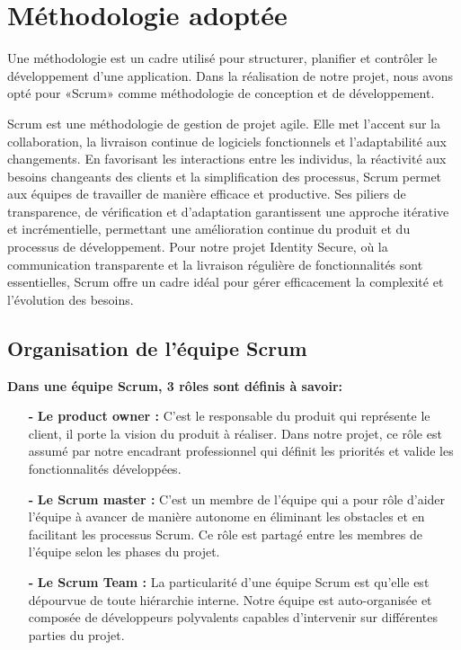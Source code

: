 \section*{Méthodologie adoptée}

Une méthodologie est un cadre utilisé pour structurer, planifier et contrôler le développement d'une application. Dans la réalisation de notre projet, nous avons opté pour «Scrum» comme méthodologie de conception et de développement.

Scrum est une méthodologie de gestion de projet agile\cite{b6}. Elle met l'accent sur la collaboration, la livraison continue de logiciels fonctionnels et l'adaptabilité aux changements. En favorisant les interactions entre les individus, la réactivité aux besoins changeants des clients et la simplification des processus, Scrum permet aux équipes de travailler de manière efficace et productive. Ses piliers de transparence, de vérification et d'adaptation garantissent une approche itérative et incrémentielle, permettant une amélioration continue du produit et du processus de développement. Pour notre projet Identity Secure, où la communication transparente et la livraison régulière de fonctionnalités sont essentielles, Scrum offre un cadre idéal pour gérer efficacement la complexité et l'évolution des besoins.
\\

\subsection{Organisation de l'équipe Scrum}

\textbf{Dans une équipe Scrum, 3 rôles sont définis à savoir: }\\

\begin{itemize}
\item[\textbf{-}] \textbf{Le product owner :} C'est le responsable du produit qui représente le client, il porte la vision du produit à réaliser. Dans notre projet, ce rôle est assumé par notre encadrant professionnel qui définit les priorités et valide les fonctionnalités développées.
\item[\textbf{-}] \textbf{Le Scrum master :} C'est un membre de l'équipe qui a pour rôle d'aider l'équipe à avancer de manière autonome en éliminant les obstacles et en facilitant les processus Scrum. Ce rôle est partagé entre les membres de l'équipe selon les phases du projet.
\item[\textbf{-}] \textbf{Le Scrum Team :} La particularité d'une équipe Scrum est qu'elle est dépourvue de toute hiérarchie interne. Notre équipe est auto-organisée et composée de développeurs polyvalents capables d'intervenir sur différentes parties du projet.
\end{itemize}

